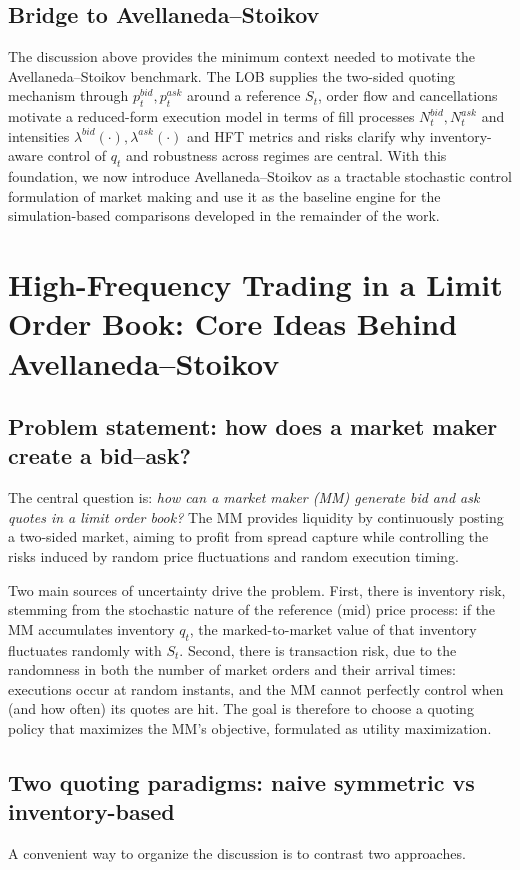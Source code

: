 \documentclass[a4paper,10pt,titlepage,oneside,openany]{book}
\theoremstyle{plain}\newtheorem{theorem}{Theorem}[chapter]
\theoremstyle{definition}\newtheorem{definition}{Definition}[chapter]
\theoremstyle{remark}\newtheorem{remark}{Remark}[chapter]
\begin{document}
\section{Bridge to Avellaneda--Stoikov}
The discussion above provides the minimum context needed to motivate the Avellaneda--Stoikov benchmark. The LOB supplies the two-sided quoting mechanism through $p_t^{bid},p_t^{ask}$ around a reference $S_t$, order flow and cancellations motivate a reduced-form execution model in terms of fill processes $N_t^{bid},N_t^{ask}$ and intensities $\lambda^{bid}(\cdot),\lambda^{ask}(\cdot)$ and HFT metrics and risks clarify why inventory-aware control of $q_t$ and robustness across regimes are central. With this foundation, we now introduce Avellaneda--Stoikov as a tractable stochastic control formulation of market making and use it as the baseline engine for the simulation-based comparisons developed in the remainder of the work.

\chapter{High-Frequency Trading in a Limit Order Book: Core Ideas Behind Avellaneda--Stoikov}
\label{sec:hft_lob_core_ideas}

\section{Problem statement: how does a market maker create a bid--ask?}
The central question is: \emph{how can a market maker (MM) generate bid and ask quotes in a limit order book?} The MM provides liquidity by continuously posting a two-sided market, aiming to profit from spread capture while controlling the risks induced by random price fluctuations and random execution timing.

Two main sources of uncertainty drive the problem. First, there is inventory risk, stemming from the stochastic nature of the reference (mid) price process: if the MM accumulates inventory $q_t$, the marked-to-market value of that inventory fluctuates randomly with $S_t$. Second, there is transaction risk, due to the randomness in both the number of market orders and their arrival times: executions occur at random instants, and the MM cannot perfectly control when (and how often) its quotes are hit. The goal is therefore to choose a quoting policy that maximizes the MM's objective, formulated as utility maximization.

\section{Two quoting paradigms: naive symmetric vs inventory-based}
A convenient way to organize the discussion is to contrast two approaches.
\end{document}
